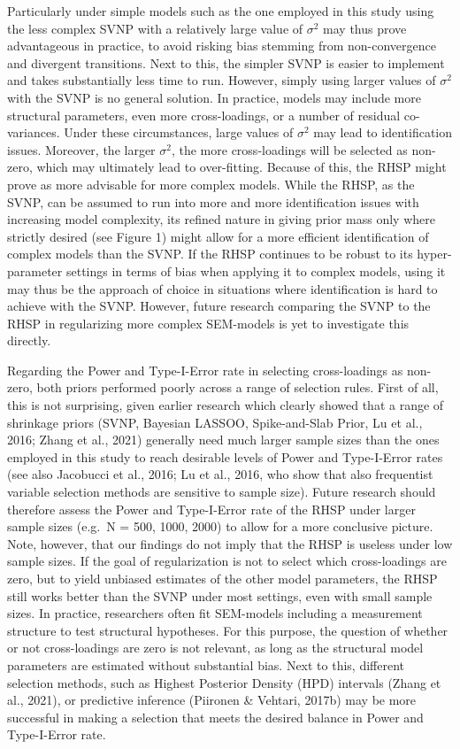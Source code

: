 \documentclass[
  man, donotrepeattitle,floatsintext]{apa6}
\begin{document}
Particularly under simple models such as the one employed in this study using the less complex SVNP with a relatively large value of \(\sigma^2\) may thus prove advantageous in practice, to avoid risking bias stemming from non-convergence and divergent transitions. Next to this, the simpler SVNP is easier to implement and takes substantially less time to run. However, simply using larger values of \(\sigma^2\) with the SVNP is no general solution. In practice, models may include more structural parameters, even more cross-loadings, or a number of residual co-variances. Under these circumstances, large values of \(\sigma^2\) may lead to identification issues. Moreover, the larger \(\sigma^2\), the more cross-loadings will be selected as non-zero, which may ultimately lead to over-fitting. Because of this, the RHSP might prove as more advisable for more complex models. While the RHSP, as the SVNP, can be assumed to run into more and more identification issues with increasing model complexity, its refined nature in giving prior mass only where strictly desired (see Figure 1) might allow for a more efficient identification of complex models than the SVNP. If the RHSP continues to be robust to its hyper-parameter settings in terms of bias when applying it to complex models, using it may thus be the approach of choice in situations where identification is hard to achieve with the SVNP. However, future research comparing the SVNP to the RHSP in regularizing more complex SEM-models is yet to investigate this directly.

Regarding the Power and Type-I-Error rate in selecting cross-loadings as non-zero, both priors performed poorly across a range of selection rules. First of all, this is not surprising, given earlier research which clearly showed that a range of shrinkage priors (SVNP, Bayesian LASSOO, Spike-and-Slab Prior, Lu et al., 2016; Zhang et al., 2021) generally need much larger sample sizes than the ones employed in this study to reach desirable levels of Power and Type-I-Error rates (see also Jacobucci et al., 2016; Lu et al., 2016, who show that also frequentist variable selection methods are sensitive to sample size). Future research should therefore assess the Power and Type-I-Error rate of the RHSP under larger sample sizes (e.g.~N = 500, 1000, 2000) to allow for a more conclusive picture. Note, however, that our findings do not imply that the RHSP is useless under low sample sizes. If the goal of regularization is not to select which cross-loadings are zero, but to yield unbiased estimates of the other model parameters, the RHSP still works better than the SVNP under most settings, even with small sample sizes. In practice, researchers often fit SEM-models including a measurement structure to test structural hypotheses. For this purpose, the question of whether or not cross-loadings are zero is not relevant, as long as the structural model parameters are estimated without substantial bias. Next to this, different selection methods, such as Highest Posterior Density (HPD) intervals (Zhang et al., 2021), or predictive inference (Piironen \& Vehtari, 2017b) may be more successful in making a selection that meets the desired balance in Power and Type-I-Error rate.
\end{document}
